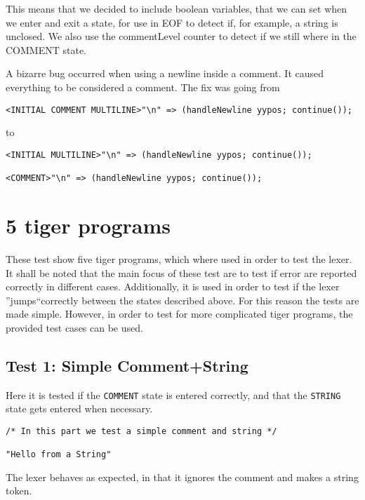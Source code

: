 \documentclass{article}
\begin{document}
This means that we decided to include boolean variables, that we can set when we enter and exit a state, for use in EOF to detect if, for example, a string is unclosed. We also use the commentLevel counter to detect if we still where in the COMMENT state.




A bizarre bug occurred when using a newline inside a comment. It caused everything to be considered a comment. The fix was going from
\begin{lstlisting}[frame=single]
<INITIAL COMMENT MULTILINE>"\n" => (handleNewline yypos; continue());
\end{lstlisting}
to
\begin{lstlisting}[frame=single]
<INITIAL MULTILINE>"\n" => (handleNewline yypos; continue());

<COMMENT>"\n" => (handleNewline yypos; continue());
\end{lstlisting}

\section{5 tiger programs}
These test show five tiger programs, which where used in order to test the lexer. It shall be noted that the main focus of these test are to test if error are reported correctly in different cases. Additionally, it is used in order to test if the lexer ''jumps``correctly between the states described above. For this reason the tests are made simple. However, in order to test for more complicated tiger programs, the provided test cases can be used.  

\subsection{Test 1: Simple Comment+String}
Here it is tested if the \texttt{COMMENT} state is entered correctly, and that the \texttt{STRING} state gets entered when necessary.

\begin{lstlisting}[frame=single]
/* In this part we test a simple comment and string */

"Hello from a String"
\end{lstlisting}

The lexer behaves as expected, in that it ignores the comment and makes a string token.
\end{document}
